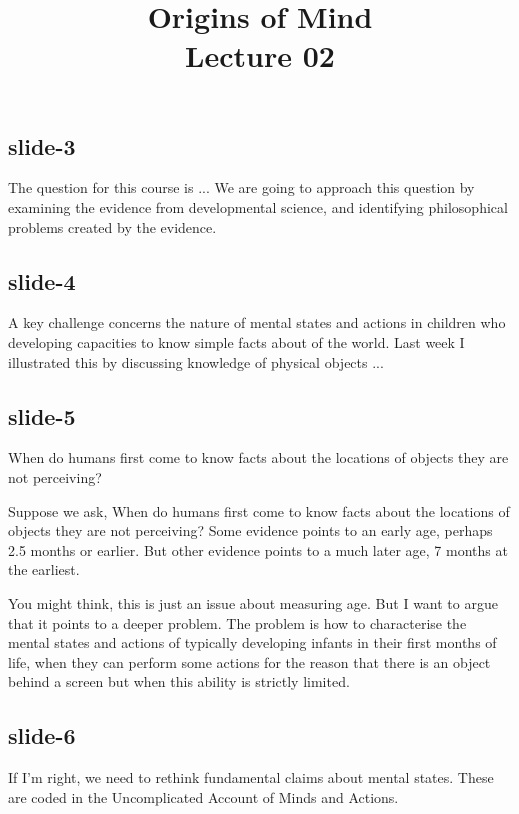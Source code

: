 \documentclass[12pt,\papersize]{extarticle}
\begin{document}
\setlength\footnotesep{1em}







\title {Origins of Mind \\ Lecture 02}
 
 
 
\maketitle
 
\subsection{slide-3}
The question for this course is ...
We are going to approach this question by examining the evidence from developmental science, 
and identifying philosophical problems created by the evidence.
 
\subsection{slide-4}
A key challenge concerns the nature of mental states and actions in 
children who developing capacities to know simple facts about of the world.
Last week I illustrated this by discussing knowledge of physical objects ...
 
\subsection{slide-5}
When do humans first come to know facts about the locations of objects they are not perceiving?
 
Suppose we ask,
When do humans first come to know facts about the locations of objects they
are not perceiving?
Some evidence points to an early age, perhaps 2.5 months or earlier.
But other evidence points to a much later age, 7 months at the earliest.
 
You might think, this is just an issue about measuring age.
But I want to argue that it points to a deeper problem.
The problem is how to characterise the mental states and actions of 
typically developing infants in their first months of life,
when they can perform some actions for the reason that there is an 
object behind a screen but when this ability is strictly limited.
 
\subsection{slide-6}
If I’m right, we need to rethink fundamental claims about mental states.
These are coded in the Uncomplicated Account of Minds and Actions.
 
\end{document}
